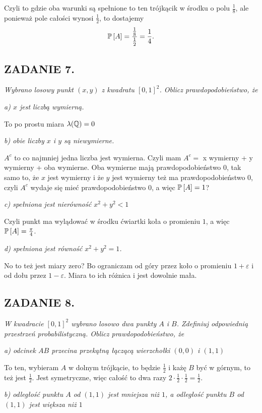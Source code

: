 \documentclass{article}
\begin{document}
Czyli to gdzie oba warunki są spełnione to ten trójkącik w środku o polu $\frac18$, ale ponieważ pole całości wynosi $\frac12$, to dostajemy
$$\mathbb{P}\left[A\right]={\frac18\over\frac12}=\frac14.$$

\subsection*{ZADANIE 7.}
\emph{Wybrano losowy punkt $(x,y)$ z kwadratu $[0,1]^2$. Oblicz prawdopodobieństwo, że}

\indent \emph{\color{blue}a) $x$ jest liczbą wymierną.}
\smallskip

To po prostu miara $\lambda(\mathbb{Q})=0$
\smallskip

\indent \emph{\color{blue}b) obie liczby $x$ i $y$ są niewymierne.}
\smallskip

$A^c$ to co najmniej jedna liczba jest wymierna. Czyli mam $A^c=$ x wymierny + y wymierny + oba wymierne. Oba wymierne mają prawdopodobieństwo 0, tak samo to, że $x$ jest wymierny i że $y$ jest wymierny też ma prawdopodobieństwo $0$, czyli $A^c$ wydaje się mieć prawdopodobieństwo $0$, a więc $\mathbb{P}\left[A\right]=1$?
\smallskip

\indent \emph{\color{blue}c) spełniona jest nierówność $x^2+y^2<1$}
\smallskip

Czyli punkt ma wylądować w środku ćwiartki koła o promieniu $1$, a więc $\mathbb{P}\left[A\right]=\frac\pi4$.
\smallskip

\indent \emph{\color{blue}d) spełniona jest równość $x^2+y^2=1$.}
\smallskip

No to też jest miary zero? Bo ograniczam od góry przez koło o promieniu $1+\varepsilon$ i od dołu przez $1-\varepsilon$. Miara to ich różnica i jest dowolnie mała.

\subsection*{ZADANIE 8.}
\emph{W kwadracie $[0,1]^2$ wybrano losowo dwa punkty $A$ i $B$. Zdefiniuj odpowiednią przestrzeń probabilistyczną. Oblicz prawdopodobieństwo, że}

\indent \emph{\color{blue}a) odcinek $AB$ przecina przekątną łączącą wierzchołki $(0,0)$ i $(1,1)$}
\smallskip

To ten, wybieram $A$ w dolnym trójkącie, to będzie $\frac12$ i każę $B$ być w górnym, to też jest $\frac12$. Jest symetryczne, więc całość to dwa razy $2\cdot \frac12\cdot\frac12=\frac12$.

\indent \emph{\color{blue}b) odległość punktu $A$ od $(1, 1)$ jest mniejsza niż $1$, a odległość punktu $B$ od $(1, 1)$ jest większa niż $1$}
\smallskip
\end{document}
